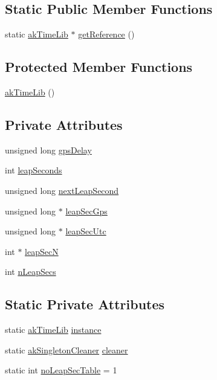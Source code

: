 \subsection*{Static Public Member Functions}
\begin{DoxyCompactItemize}
\item 
static \hyperlink{classakTimeLib}{ak\-Time\-Lib} $\ast$ \hyperlink{classakTimeLib_a60a13be5767c7e66c10e0ec9e10ad7d1}{get\-Reference} ()
\end{DoxyCompactItemize}
\subsection*{Protected Member Functions}
\begin{DoxyCompactItemize}
\item 
\hyperlink{classakTimeLib_a63e21732142b1b753a5bea511db61780}{ak\-Time\-Lib} ()
\end{DoxyCompactItemize}
\subsection*{Private Attributes}
\begin{DoxyCompactItemize}
\item 
unsigned long \hyperlink{classakTimeLib_aece53a073d766b0842004433bbb743bc}{gps\-Delay}
\item 
int \hyperlink{classakTimeLib_a1792f1ade7d43742f16880fc3747a472}{leap\-Seconds}
\item 
unsigned long \hyperlink{classakTimeLib_adc38424ed0d1365181685654c1e430dc}{next\-Leap\-Second}
\item 
unsigned long $\ast$ \hyperlink{classakTimeLib_a0e3a8f8795bb2911947530ccbfe8797f}{leap\-Sec\-Gps}
\item 
unsigned long $\ast$ \hyperlink{classakTimeLib_a9b0bc2cb3fe5d6544ef93900c00a8b96}{leap\-Sec\-Utc}
\item 
int $\ast$ \hyperlink{classakTimeLib_afb895cbc388c984925ab8ebe8361e23e}{leap\-Sec\-N}
\item 
int \hyperlink{classakTimeLib_a95186789b9668d0b3a242ac8a57bf634}{n\-Leap\-Secs}
\end{DoxyCompactItemize}
\subsection*{Static Private Attributes}
\begin{DoxyCompactItemize}
\item 
static \hyperlink{classakTimeLib}{ak\-Time\-Lib} \hyperlink{classakTimeLib_a85a5f79db7d7ddebce2174d8e7241a62}{instance}
\item 
static \hyperlink{classakSingletonCleaner}{ak\-Singleton\-Cleaner} \hyperlink{classakTimeLib_a69bc0356384bc7976926ac8c9e32847f}{cleaner}
\item 
static int \hyperlink{classakTimeLib_ad6b1a7cd89c1cccd32277b7c5442a597}{no\-Leap\-Sec\-Table} = 1
\end{DoxyCompactItemize}
